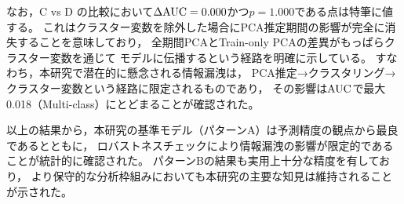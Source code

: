 なお，C vs D の比較において$\Delta\mathrm{AUC} = 0.000$かつ$p = 1.000$である点は特筆に値する。
これはクラスター変数を除外した場合にPCA推定期間の影響が完全に消失することを意味しており，
全期間PCAとTrain-only PCAの差異がもっぱらクラスター変数を通じて
モデルに伝播するという経路を明確に示している。
すなわち，本研究で潜在的に懸念される情報漏洩は，
PCA推定→クラスタリング→クラスター変数という経路に限定されるものであり，
その影響は$\mathrm{AUC}$で最大0.018（Multi-class）にとどまることが確認された。

以上の結果から，本研究の基準モデル（パターンA）は予測精度の観点から最良であるとともに，
ロバストネスチェックにより情報漏洩の影響が限定的であることが統計的に確認された。
パターンBの結果も実用上十分な精度を有しており，
より保守的な分析枠組みにおいても本研究の主要な知見は維持されることが示された。

